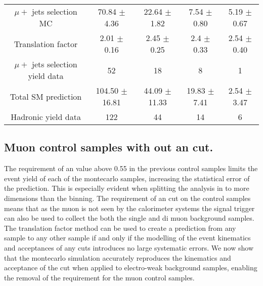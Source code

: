 \begin{table}[|h]
\begin{tabular}{ |c|c|c|c|c| }
$\mu +$ jets selection MC         & 70.84  $\pm$  4.36     & 22.64  $\pm$  1.82     & 7.54  $\pm$  0.80     & 5.19  $\pm$  0.67    \\ 
Translation factor                & 2.01  $\pm$  0.16      & 2.45  $\pm$  0.25      & 2.4  $\pm$  0.33     & 2.54  $\pm$  0.40    \\ 
$\mu +$ jets selection yield data & 52                     & 18                     & 8                     & 1                    \\ 
Total SM prediction               & 104.50  $\pm$  16.81   & 44.09  $\pm$  11.33    & 19.83  $\pm$  7.41    & 2.54  $\pm$  3.47    \\ 
Hadronic yield data               & 122                    & 44                     & 14                    & 6                    \\ 
\hline

\end{tabular}
\end{table}

\subsection{Muon control samples with out an \alt cut.} %
\label{par:muon_control_samples_with_out_an_alt_cut_}
  
The requirement of an \alt value above 0.55 in the previous control samples 
limits the event yield of each of the montecarlo samples, increasing the 
statistical error of the prediction. This is especially evident when splitting 
the analysis in to more dimensions than the \HT binning. The requirement of an 
\alt cut on the control samples means that as the muon is not seen by the 
calorimeter systems the signal trigger can also be used to collect the both the 
single and di muon background samples.
The translation factor method can be used to create a prediction from any 
sample to any other sample if and only if the modelling of the event kinematics 
and acceptances of any cuts introduces no large systematic errors. We now show 
that the montecarlo simulation accurately reproduces the kinematics and 
acceptance of the \alt cut when applied to electro-weak background samples, 
enabling the removal of the \alt requirement for the muon control samples.


